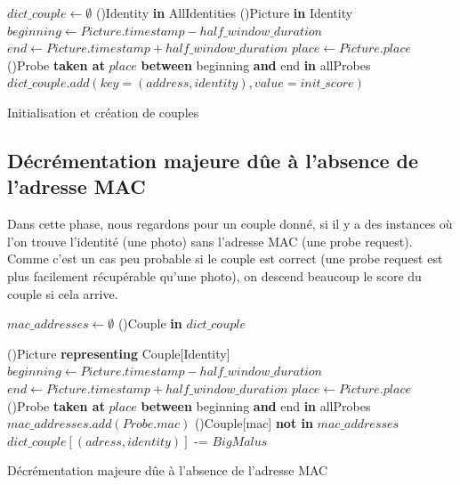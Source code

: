 \begin{algorithm2e}[H]
	\SetAlgoLined
	$dict\_couple  \gets \emptyset $\;
	\ForEach(){Identity \textbf{in} AllIdentities}{
		 \ForEach(){Picture \textbf{in} Identity}{
			 $beginning \gets Picture.timestamp - half\_window\_duration$\;
			 $end \gets Picture.timestamp + half\_window\_duration$\;
			 $place \gets Picture.place$\;
			 \ForEach(){Probe \textbf{taken at} $place$ \textbf{between} beginning \textbf{and} end \textbf{in} allProbes}{
				$dict\_couple.add(key=(address, identity), value=init\_score)$
			 }
			}
		}
	\caption{Initialisation et création de couples}
\end{algorithm2e}

\subsection{Décrémentation majeure dûe à l'absence de l'adresse MAC}
Dans cette phase, nous regardons pour un couple donné, si il y a des instances où l'on trouve 
l'identité (une photo) sans l'adresse MAC (une probe request). Comme c'est un cas peu probable si le couple
est correct (une probe request est plus facilement récupérable qu'une photo), on descend beaucoup le score du couple si cela arrive.

\begin{algorithm2e}[H]
	\SetAlgoLined
	$mac\_addresses  \gets \emptyset $\;
	\ForEach(){Couple \textbf{in} $dict\_couple$}{
		 \ForEach(){Picture \textbf{representing} Couple[Identity]}{
			$beginning \gets Picture.timestamp - half\_window\_duration$\;
			$end \gets Picture.timestamp + half\_window\_duration$\;
			$place \gets Picture.place$\; 
			\ForEach(){Probe \textbf{taken at} $place$ \textbf{between} beginning \textbf{and} end \textbf{in} allProbes}{
				$mac\_addresses.add(Probe.mac)$
			 }
			}
		\If(){Couple[mac] \textbf{not in} $mac\_addresses$}{
			$dict\_couple[(adress, identity)]$ -= $BigMalus$\;
		}

		}
	\caption{Décrémentation majeure dûe à l'absence de l'adresse MAC}
\end{algorithm2e}


